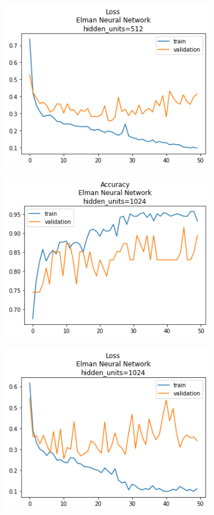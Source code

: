 \documentclass[12pt, a4paper]{article}
\begin{document}
\begin{figure}
\begin{subfigure}{0.45\linewidth}
        \includegraphics[width=0.9\linewidth]{images/q1/elman/loss_Elman Neural Networkhidden_units=512.png}
    \end{subfigure}
    \begin{subfigure}{0.45\linewidth}
        \includegraphics[width=0.9\linewidth]{images/q1/elman/acc_Elman Neural Networkhidden_units=1024.png}
    \end{subfigure}
    \hfill
    \begin{subfigure}{0.45\linewidth}
        \includegraphics[width=0.9\linewidth]{images/q1/elman/loss_Elman Neural Networkhidden_units=1024.png}

\end{subfigure}
\end{figure}
\end{document}
